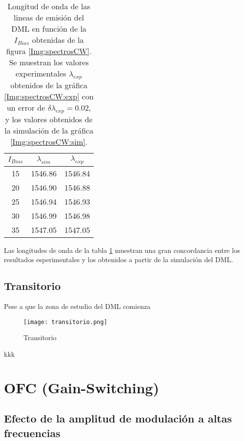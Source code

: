 				\begin{table}[H]
					\centering
					\begin{tabular}{c c c}
						\hline
						$I_{Bias}$ & $\lambda_{sim}$ & $\lambda_{exp}$ \\\hline 
						15 & 1546.86 & 1546.84 \\
						20 & 1546.90 & 1546.88 \\
						25 & 1546.94 & 1546.93 \\
						30 & 1546.99 & 1546.98 \\
						35 & 1547.05 & 1547.05 \\\hline
					\end{tabular}
					\caption{\label{tab:lambdas}Longitud de onda de las lineas de emisión del DML en función de la $I_{Bias}$ obtenidas de la figura \ref{Img:spectrosCW}. Se muestran los valores experimentales $\lambda_{exp}$ obtenidos de la gráfica \ref{Img:spectrosCW:exp} con un error de $\delta\lambda_{exp} = 0.02$, y los valores obtenidos de la simulación de la gráfica \ref{Img:spectrosCW:sim}.}
				\end{table}

			Las longitudes de onda de la tabla \ref{tab:lambdas} muestran una gran concordancia entre los resultados esperimentales y los obtenidos a partir de la simulación del DML. 
	
		\subsection{Transitorio}

			Pese a que la zona de estudio del DML comienza 
				
				\begin{figure}[H]
					\centering
					\texttt{[image: transitorio.png]}
					\caption{\label{Img:transitorio}Transitorio}	
				\end{figure}
				kkk

	\section{OFC (Gain-Switching)}

		\subsection{Efecto de la amplitud de modulación a altas frecuencias}

